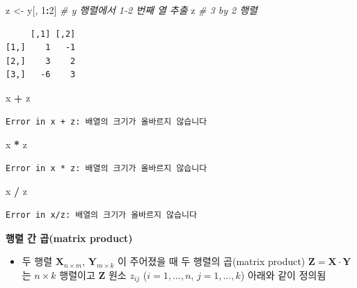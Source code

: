 \documentclass[
  11pt,
]{krantz}
\newenvironment{Shaded}{\begin{snugshade}}{\end{snugshade}}
\newcommand{\CommentTok}[1]{\textcolor[rgb]{0.37,0.37,0.37}{\textit{#1}}}
\newcommand{\DecValTok}[1]{\textcolor[rgb]{0.06,0.06,0.06}{#1}}
\newcommand{\NormalTok}[1]{#1}
\newcommand{\OperatorTok}[1]{\textcolor[rgb]{0.43,0.43,0.43}{\textbf{#1}}}
\newcommand{\StringTok}[1]{\textcolor[rgb]{0.5,0.5,0.5}{#1}}
\providecommand{\tightlist}{%
  \setlength{\itemsep}{0pt}\setlength{\parskip}{0pt}}
\begin{document}
\begin{Shaded}
\begin{Highlighting}[]
\NormalTok{z <-}\StringTok{ }\NormalTok{y[, }\DecValTok{1}\OperatorTok{:}\DecValTok{2}\NormalTok{] }\CommentTok{# y 행렬에서 1-2 번째 열 추출}
\NormalTok{z }\CommentTok{# 3 by 2 행렬}
\end{Highlighting}
\end{Shaded}

\begin{verbatim}
     [,1] [,2]
[1,]    1   -1
[2,]    3    2
[3,]   -6    3
\end{verbatim}

\begin{Shaded}
\begin{Highlighting}[]
\NormalTok{x }\OperatorTok{+}\StringTok{ }\NormalTok{z}
\end{Highlighting}
\end{Shaded}

\begin{verbatim}
Error in x + z: 배열의 크기가 올바르지 않습니다
\end{verbatim}

\begin{Shaded}
\begin{Highlighting}[]
\NormalTok{x }\OperatorTok{*}\StringTok{ }\NormalTok{z}
\end{Highlighting}
\end{Shaded}

\begin{verbatim}
Error in x * z: 배열의 크기가 올바르지 않습니다
\end{verbatim}

\begin{Shaded}
\begin{Highlighting}[]
\NormalTok{x }\OperatorTok{/}\StringTok{ }\NormalTok{z}
\end{Highlighting}
\end{Shaded}

\begin{verbatim}
Error in x/z: 배열의 크기가 올바르지 않습니다
\end{verbatim}

\normalsize

\textbf{행렬 간 곱(matrix product)}

\begin{itemize}
\tightlist
\item
  두 행렬 \(\mathrm{\mathbf X}_{n\times m}\), \(\mathrm{\mathbf Y}_{m\times k}\) 이 주어졌을 때 두 행렬의 곱(matrix product) \(\mathrm{\mathbf Z} = \mathrm{\mathbf {X\cdot Y}}\)는 \(n \times k\) 행렬이고 \(\mathrm{\mathbf Z}\) 원소 \(z_{ij}\) (\(i={1,\ldots,n}\), \(j={1,\ldots,k}\)) 아래와 같이 정의됨
\end{itemize}
\end{document}
